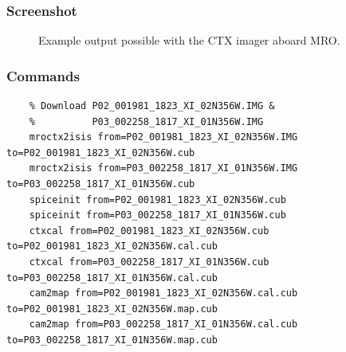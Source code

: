 \subsubsection*{Screenshot}

\begin{figure}[h!]
\centering
  \hfil
\caption{Example output possible with the CTX imager aboard MRO.}
\label{fig:ctx_example}
\end{figure}

\subsubsection*{Commands}

\begin{verbatim}
    % Download P02_001981_1823_XI_02N356W.IMG &
    %          P03_002258_1817_XI_01N356W.IMG
    mroctx2isis from=P02_001981_1823_XI_02N356W.IMG to=P02_001981_1823_XI_02N356W.cub
    mroctx2isis from=P03_002258_1817_XI_01N356W.IMG to=P03_002258_1817_XI_01N356W.cub
    spiceinit from=P02_001981_1823_XI_02N356W.cub
    spiceinit from=P03_002258_1817_XI_01N356W.cub
    ctxcal from=P02_001981_1823_XI_02N356W.cub to=P02_001981_1823_XI_02N356W.cal.cub
    ctxcal from=P03_002258_1817_XI_01N356W.cub to=P03_002258_1817_XI_01N356W.cal.cub
    cam2map from=P02_001981_1823_XI_02N356W.cal.cub to=P02_001981_1823_XI_02N356W.map.cub
    cam2map from=P03_002258_1817_XI_01N356W.cal.cub to=P03_002258_1817_XI_01N356W.map.cub
\end{verbatim}

